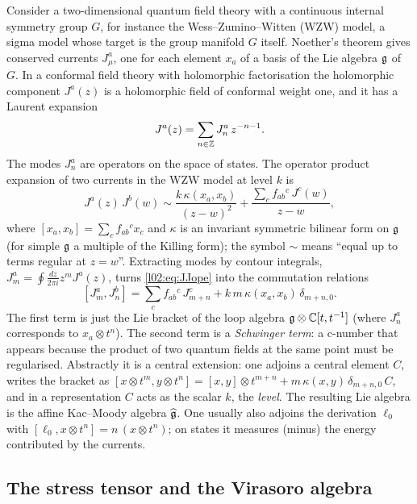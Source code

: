 Consider a two-dimensional quantum field theory with a continuous internal symmetry group $G$, for
instance the Wess--Zumino--Witten (WZW) model, a sigma model whose target is the group manifold
$G$ itself. Noether's theorem gives conserved currents $J^a_\mu$, one for each element $x_a$ of a
basis of the Lie algebra $\mathfrak{g}$ of $G$. In a conformal field theory with holomorphic
factorisation the holomorphic component $J^a(z)$ is a holomorphic field of conformal weight one,
and it has a Laurent expansion
\begin{equation*}
 J^a(z) = \sum_{n\in{\mathbb{Z}}} J^a_n\, z^{-n-1}.
\end{equation*}
The modes $J^a_n$ are operators on the space of states. The operator product expansion of two
currents in the WZW model at level $k$ is
\begin{equation}\label{l02:eq:JJope}
 J^a(z)\,J^b(w) \sim \frac{k\,\kappa(x_a,x_b)}{(z-w)^2} + \frac{\sum_c f_{ab}{}^c\,J^c(w)}{z-w},
\end{equation}
where $[x_a,x_b] = \sum_c f_{ab}{}^c x_c$ and $\kappa$ is an invariant symmetric bilinear form on
$\mathfrak{g}$ (for simple $\mathfrak{g}$ a multiple of the Killing form); the symbol $\sim$ means ``equal up to terms
regular at $z = w$''. Extracting modes by contour integrals, $J^a_m = \oint\frac{dz}{2\pi i}z^mJ^a(z)$, turns
\eqref{l02:eq:JJope} into the commutation relations
\begin{equation}\label{l02:eq:affinemodes}
 [J^a_m, J^b_n] = \sum_c f_{ab}{}^c\, J^c_{m+n} + k\, m\, \kappa(x_a,x_b)\,\delta_{m+n,0}.
\end{equation}
The first term is just the Lie bracket of the loop algebra $\mathfrak{g}\otimes{\mathbb{C}}[t,t^{-1}]$ (where
$J^a_n$ corresponds to $x_a\otimes t^n$). The second term is a \emph{Schwinger term}: a c-number
that appears because the product of two quantum fields at the same point must be regularised.
Abstractly it is a central extension: one adjoins a central element $C$, writes the bracket as
$[x\otimes t^m, y\otimes t^n] = [x,y]\otimes t^{m+n} + m\,\kappa(x,y)\,\delta_{m+n,0}\,C$, and in
a representation $C$ acts as the scalar $k$, the \emph{level}. The resulting Lie algebra is the
affine Kac--Moody algebra $\widehat{\mathfrak{g}}$. One usually also adjoins the derivation $\ell_0$ with
$[\ell_0, x\otimes t^n] = n\,(x\otimes t^n)$; on states it measures (minus) the energy contributed
by the currents.

\subsection{The stress tensor and the Virasoro algebra}

